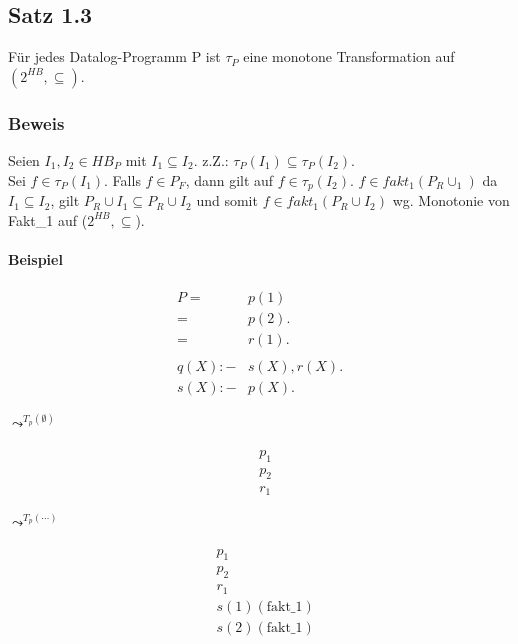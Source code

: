 \documentclass[12pt, a4paper]{article}
\begin{document}
\subsection*{Satz 1.3} Für jedes Datalog-Programm P ist $\tau_P$ eine monotone Transformation auf $(2^{HB}, \subseteq)$.

\subsubsection*{Beweis}
Seien $I_1, I_2 \in HB_P$ mit $I_1 \subseteq I_2$. z.Z.: $\tau_P(I_1) \subseteq \tau_P(I_2)$. \\
Sei $f \in \tau_P(I_1)$. Falls $f \in P_F$, dann gilt auf $f \in \tau_p(I_2)$. $f \in fakt_1(P_R \cup _1)$ da $I_1 \subseteq I_2$, gilt $P_R \cup I_1 \subseteq P_R \cup I_2$ und somit $f \in fakt_1(P_R \cup I_2)$ wg. Monotonie von Fakt\_1 auf ($2^{HB}, \subseteq$).


\paragraph{Beispiel}

\begin{equation}
\begin{split}
P = &p(1) \\
= &p(2). \\
= &r(1). \\
&\\
q(X) :- &s(X), r(X). \\
s(X) :- &p(X).
\end{split}
\end{equation}

$\leadsto^{T_p(\emptyset)}$

\begin{equation}
\begin{split}
&p_1\\
&p_2 \\
&r_1
\end{split}
\end{equation}

$\leadsto^{T_p(\cdots)}$

\begin{equation}
\begin{split}
&p_1\\
&p_2 \\
&r_1\\
&s(1) (\text{fakt\_1}) \\
&s(2) (\text{fakt\_1})
\end{split}
\end{equation}
\end{document}
